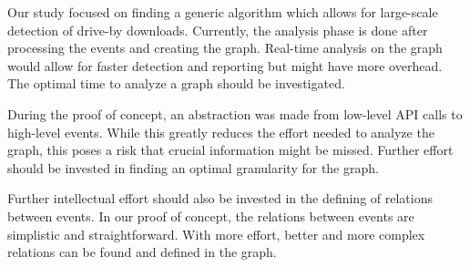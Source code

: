 Our study focused on finding a generic algorithm which allows for large-scale detection of drive-by downloads. Currently, the analysis phase is done after processing the events and creating the graph. Real-time analysis on the graph would allow for faster detection and reporting but might have more overhead. The optimal time to analyze a graph should be investigated.

During the proof of concept, an abstraction was made from low-level API calls to high-level events. While this greatly reduces the effort needed to analyze the graph, this poses a risk that crucial information might be missed. Further effort should be invested in finding an optimal granularity for the graph.

Further intellectual effort should also be invested in the defining of relations between events. In our proof of concept, the relations between events are simplistic and straightforward. With more effort, better and more complex relations can be found and defined in the graph.

